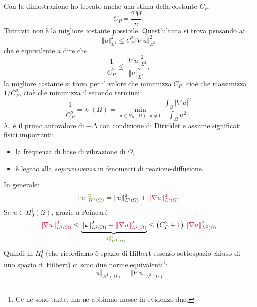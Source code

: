 \documentclass[10pt,a4paper,twoside,openright]{book}
\begin{document}
\begin{oss}
    Con la dimostrazione ho trovato anche una stima della costante $\displaystyle C_{P}$:
    \begin{equation*}
        C_{P} =\frac{2M}{n} .
    \end{equation*}
    Tuttavia non è la migliore costante possibile. Quest'ultima si trova pensando a:
    \begin{equation*}
        \Vert u\Vert _{L^{2}}^{2} \leqslant C_{P}^{2}\Vert \nabla u\Vert _{L^{2}}^{2}
    \end{equation*}
    che è equivalente a dire che
    \begin{equation*}
        \frac{1}{C_{P}^{2}} \leqslant \frac{\Vert \nabla u\Vert _{L^{2}}^{2}}{\Vert u\Vert _{L^{2}}^{2}} ,
    \end{equation*}
    la migliore costante si trova per il valore che minimizza $\displaystyle C_{P}$, cioè che massimizza $\displaystyle 1/C_{P}^{2}$, cioè che minimizza il secondo termine:
    \begin{equation}
        \frac{1}{C_{P}^{2}} =\lambda _{1}(\Omega) =\min_{u\in H_{0}^{1}(\Omega) ,\ u\neq 0}\frac{\int _{\Omega }| \nabla u| ^{2}}{\int _{\Omega } u^{2}}
    \end{equation}
    $\displaystyle \lambda _{1}$ è il primo autovalore di $\displaystyle -\Delta $ con condizione di Dirichlet e assume significati fisici importanti:
    \begin{itemize}
        \item la frequenza di base di vibrazione di $\displaystyle \Omega $,
        \item è legato alla \textit{sopravvivenza} in fenomenti di reazione-diffusione.
    \end{itemize}
\end{oss}
\begin{oss}
    In generale:
    \begin{equation*}
        \textcolor[rgb]{0.25,0.46,0.02}{\Vert u\Vert _{H^{1}(\Omega)}^{2}} =\Vert u\Vert _{L^{2}(\Omega)}^{2} +\textcolor[rgb]{0.82,0.01,0.11}{\Vert \nabla u\Vert _{L^{2}(\Omega)}^{2}}
    \end{equation*}
    Se $\displaystyle u\in H_{0}^{1}(\Omega)$, grazie a Poincaré
    \begin{equation}
        \textcolor[rgb]{0.82,0.01,0.11}{\Vert \nabla u\Vert _{L^{2}(\Omega)}^{2}} \leqslant \underbrace{\Vert u\Vert _{L^{2}(\Omega)}^{2} +\textcolor[rgb]{0.82,0.01,0.11}{\Vert \nabla u\Vert _{L^{2}(\Omega)}^{2}}}_{\textcolor[rgb]{0.25,0.46,0.02}{\Vert u\Vert _{H^{1}(\Omega)}^{2}}} \leqslant \left(C_{P}^{2} +1\right)\textcolor[rgb]{0.82,0.01,0.11}{\Vert \nabla u\Vert _{L^{2}(\Omega)}^{2}}
        \label{eq:af-stima-poincare}
    \end{equation}
    Quindi in $\displaystyle H_{0}^{1}$ (che ricordiamo è spazio di Hilbert essenso sottospazio chiuso di uno spazio di Hilbert) ci sono due norme equivalenti\footnote{Ce ne sono tante, ma ne abbiamo messe in evidenza due.}:
    \begin{equation*}
        \Vert u\Vert _{H^{1}(\Omega)} \ \ \ \ \ \ \Vert \nabla u\Vert _{L^{2}(\Omega)}
    \end{equation*}
\end{oss}
\end{document}
